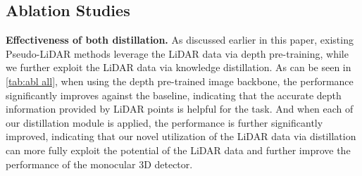 \documentclass[runningheads]{llncs}
\begin{document}
\begin{table}[t]
    \small
    \centering
        \caption{Effectiveness of both distillation and the extension to handle unlabeled data. 
         denotes using depth pre-trained backbone.
         denotes feature distillation. 
         denotes response distillation. 
         denotes distilling additional unlabeled data.}
    \label{tab:abl all}
\end{table}


\subsection{Ablation Studies}
\textbf{Effectiveness of both distillation.}
As discussed earlier in this paper, existing Pseudo-LiDAR methods \cite{PL,PL++,AMOD,monopl} leverage the LiDAR data via depth pre-training,
while we further exploit the LiDAR data via knowledge distillation.
As can be seen in \cref{tab:abl all}, when using the depth pre-trained image backbone, the performance significantly improves against the baseline, indicating that the accurate depth information provided by LiDAR points is helpful for the task.
And when each of our distillation module is applied, the performance is further significantly improved, indicating that our novel utilization of the LiDAR data via distillation can more fully exploit the potential of the LiDAR data and further improve the performance of the monocular 3D detector.
\end{document}
